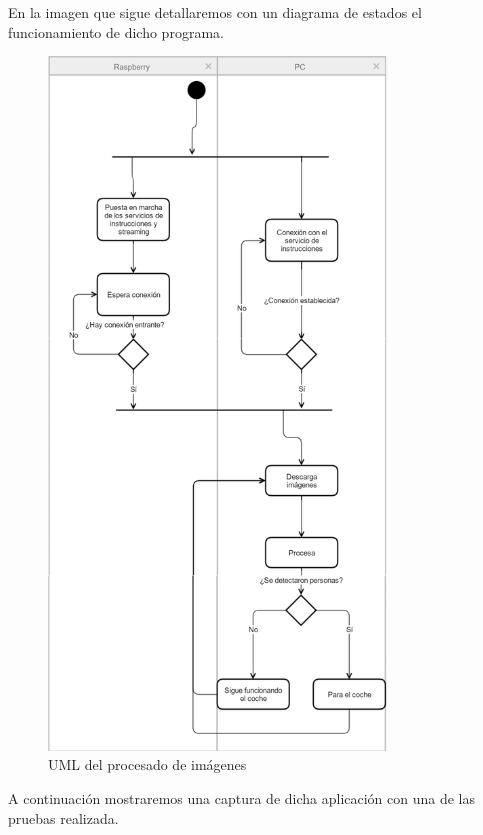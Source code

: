 \documentclass{pclass}
\begin{document}
\begin{itemize}
\begin{itemize}
		En la imagen que sigue detallaremos con un diagrama de estados el funcionamiento de dicho programa.
		
		\begin{figure}[H]
			\centering
			\includegraphics[width=0.8\textwidth]{img/procesadoUML}
			\caption{UML del procesado de imágenes}
			\label{fig:procesadoUML}
		\end{figure}
		
	
		
		
		A continuación mostraremos una captura de dicha aplicación con una de las pruebas realizada.
		

\end{itemize}
\end{itemize}
\end{document}
